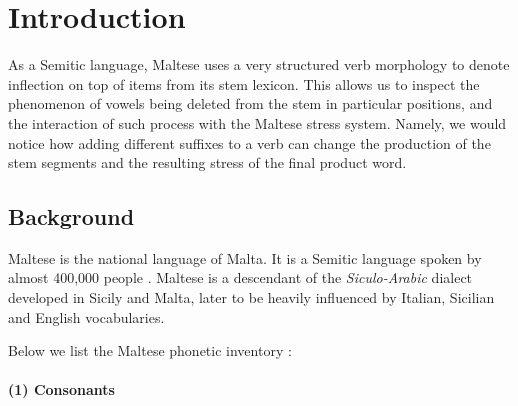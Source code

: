 \documentclass[12pt,draft]{article}
\begin{document}
\maketitle


\section{Introduction}

As a Semitic language, Maltese uses a very structured verb morphology to denote inflection on top of items from its stem lexicon.
This allows us to inspect the phenomenon of vowels being deleted from the stem in particular positions, and the interaction of such process with the Maltese stress system.
Namely, we would notice how adding different suffixes to a verb can change the production of the stem segments and the resulting stress of the final product word.

\subsection{Background}
Maltese is the national language of Malta. It is a Semitic language spoken by almost 400,000 people \cite{borg1997}.
Maltese is a descendant of the \emph{Siculo-Arabic} dialect developed in Sicily and Malta, later to be heavily influenced by Italian, Sicilian and English vocabularies.

\pagebreak

Below we list the Maltese phonetic inventory \cite{borg1997}:

\paragraph*{(1) Consonants}
\mbox{} %

\end{document}
